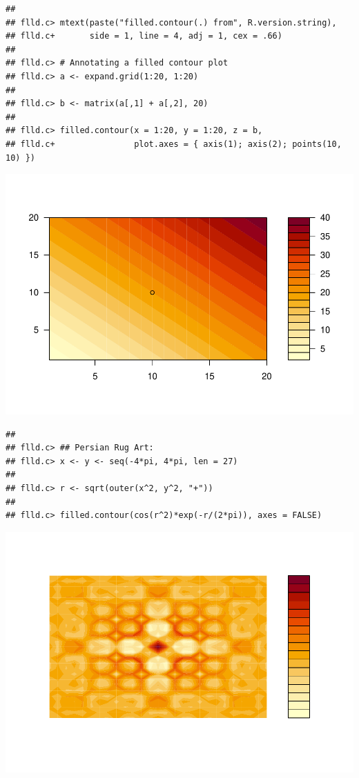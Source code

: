 \documentclass[]{book}
\begin{document}
\begin{verbatim}
## 
## flld.c> mtext(paste("filled.contour(.) from", R.version.string),
## flld.c+       side = 1, line = 4, adj = 1, cex = .66)
## 
## flld.c> # Annotating a filled contour plot
## flld.c> a <- expand.grid(1:20, 1:20)
## 
## flld.c> b <- matrix(a[,1] + a[,2], 20)
## 
## flld.c> filled.contour(x = 1:20, y = 1:20, z = b,
## flld.c+                plot.axes = { axis(1); axis(2); points(10, 10) })
\end{verbatim}

\includegraphics{TudodoR_files/figure-latex/unnamed-chunk-145-6.pdf}

\begin{verbatim}
## 
## flld.c> ## Persian Rug Art:
## flld.c> x <- y <- seq(-4*pi, 4*pi, len = 27)
## 
## flld.c> r <- sqrt(outer(x^2, y^2, "+"))
## 
## flld.c> filled.contour(cos(r^2)*exp(-r/(2*pi)), axes = FALSE)
\end{verbatim}

\includegraphics{TudodoR_files/figure-latex/unnamed-chunk-145-7.pdf}
\end{document}
